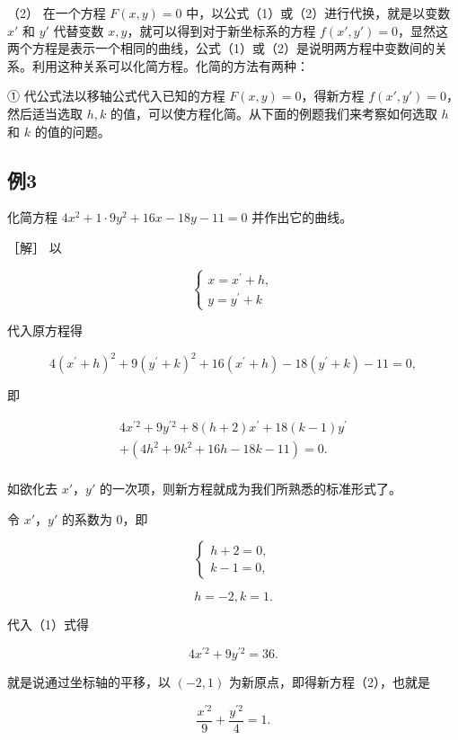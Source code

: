 （2） 在一个方程 \(F(x, y) = 0\)
中，以公式（1）或（2）进行代换，就是以变数 \(x'\) 和 \(y'\) 代替变数
\(x, y\)，就可以得到对于新坐标系的方程
\(f(x', y') = 0\)，显然这两个方程是表示一个相同的曲线，公式（1）或（2）是说明两方程中变数间的关系。利用这种关系可以化简方程。化简的方法有两种：

① 代公式法以移轴公式代入已知的方程 \(F(x, y) = 0\)，得新方程
\(f(x', y') = 0\)，然后适当选取 \(h, k\)
的值，可以使方程化简。从下面的例题我们来考察如何选取 \(h\) 和 \(k\)
的值的问题。

\subsection{例3}\label{ux4f8b3-21}

化简方程 \(4x^{2}+1\cdot9y^{2}+16x-18y-11=0\) 并作出它的曲线。

［解］ 以

\[
\left\{ \begin{array}{l} x = x^{\prime} + h, \\ y = y^{\prime} + k \end{array} \right.
\]

代入原方程得

\[
4 (x^{\prime} + h) ^ {2} + 9 (y^{\prime} + k) ^ {2} + 16 (x^{\prime} + h) - 18 (y^{\prime} + k) - 11 = 0,
\]

即

\[
\begin{array}{l} 4 x^{\prime 2} + 9 y^{\prime 2} + 8 (h + 2) x^{\prime} + 18 (k - 1) y^{\prime} \\ + (4 h^{2} + 9 k^{2} + 16 h - 18 k - 11) = 0. \tag {1} \\ \end{array}
\]

如欲化去 \(x'\)，\(y'\) 的一次项，则新方程就成为我们所熟悉的标准形式了。

令 \(x'\)，\(y'\) 的系数为 0，即

\[
\left\{ \begin{array}{l} h + 2 = 0, \\ k - 1 = 0, \end{array} \right.
\]

\[
h = - 2, k = 1.
\]

代入（1）式得

\[
4 x^{\prime 2} + 9 y^{\prime 2} = 36. \tag {2}
\]

就是说通过坐标轴的平移，以 \((-2,1)\) 为新原点，即得新方程（2），也就是

\[
\frac {x^{\prime 2}}{9} + \frac {y^{\prime 2}}{4} = 1.
\]

